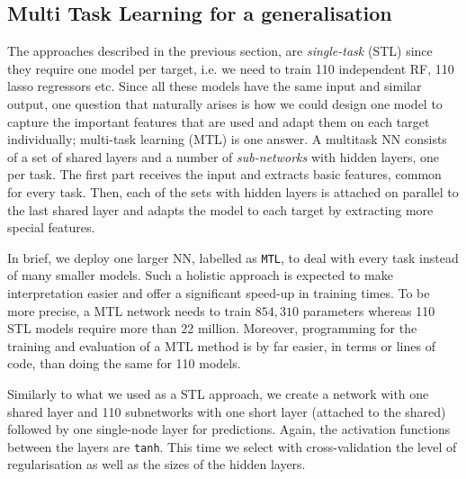 \documentclass[10pt]{article}
\begin{document}
\subsection{Multi Task Learning for a generalisation}

The approaches described in the previous section,  are \textit{single-task} (STL) since they require one model per target, i.e. we need to train 110 independent RF, 110 lasso regressors etc. Since all these models have the same input and similar output, one question that naturally arises is how we could design one model to capture the important features that are used and adapt them on each target individually; multi-task learning (MTL) is one answer. A multitask NN consists of a set of shared layers and a number of \textit{sub-networks} with hidden layers, one per task. The first part receives the input and extracts basic features, common for every task. Then, each of the sets with hidden layers is attached on parallel to the last shared layer and adapts the model to each target by extracting more special features. 

In brief, we deploy one larger NN, labelled as \texttt{MTL}, to deal with every task instead of many smaller models. Such a holistic approach is expected to make interpretation easier and offer a significant speed-up in training times. To be more precise, a MTL network needs to train $854,310$ parameters whereas 110 STL models require more than 22 million. Moreover, programming for the training and evaluation of a MTL method is by far easier, in terms or lines of code, than doing the same for 110 models. 


Similarly to what we used as a STL approach, we create a network with one shared layer and 110 subnetworks with one short layer (attached to the shared) followed by one single-node layer for predictions. Again, the activation functions between the layers are \texttt{tanh}. This time we select with cross-validation the level of regularisation as well as the sizes of the hidden layers.
\end{document}
